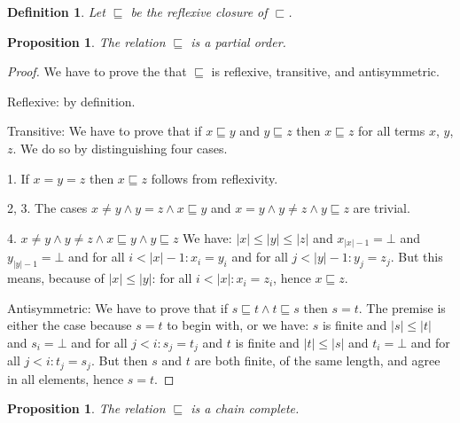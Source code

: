 \documentclass[a4paper]{article}
\newtheorem{defPartialOrderNuF}[defNuF]{Definition}
\newtheorem{thmPONuFisPartial}[defNuF]{Proposition}
\newtheorem{thmPONuFisChainComplete}[defNuF]{Proposition}
\begin{document}
\begin{defPartialOrderNuF}

Let $\sqsubseteq$ be the reflexive closure of $\sqsubset$.

\end{defPartialOrderNuF}


\begin{thmPONuFisPartial}

The relation $\sqsubseteq$ is a partial order.

\end{thmPONuFisPartial}


\begin{proof}

We have to prove the that $\sqsubseteq$ is reflexive, transitive, and
antisymmetric.

Reflexive: by definition.

Transitive: We have to prove that if $x \sqsubseteq y$ and $y \sqsubseteq z$
then $x \sqsubseteq z$ for all terms $x$, $y$, $z$. We do so by distinguishing
four cases.

1. If $x = y = z$ then $x \sqsubseteq z$ follows from reflexivity.

2, 3. The cases $x \neq y \wedge y = z \wedge x \sqsubseteq y$ and $x = y
\wedge y \neq z \wedge y \sqsubseteq z$ are trivial.

4. $x \neq y \wedge y \neq z \wedge x \sqsubseteq y \wedge y \sqsubseteq z$ We
have: $|x| \leq |y| \leq |z|$ and $x_{|x|-1} = \bot$ and $y_{|y|-1} = \bot$ and
for all $i < |x|-1: x_i = y_i$ and for all $j < |y|-1: y_j = z_j$.  But this
means, because of $|x| \leq |y|$: for all $i < |x|: x_i = z_i$, hence $x
\sqsubseteq z$.

Antisymmetric: We have to prove that if $s \sqsubseteq t \wedge t \sqsubseteq
s$ then $s = t$.  The premise is either the case because $s = t$ to begin with,
or we have: $s$ is finite and $|s| \leq |t|$ and $s_i = \bot$ and for all $j <
i: s_j = t_j$ and $t$ is finite and $|t| \leq |s|$ and $t_i = \bot$ and for all
$j < i: t_j = s_j$.  But then $s$ and $t$ are both finite, of the same length,
and agree in all elements, hence $s = t$.

\end{proof}

\begin{thmPONuFisChainComplete}

The relation $\sqsubseteq$ is a chain complete.

\end{thmPONuFisChainComplete}
\end{document}
